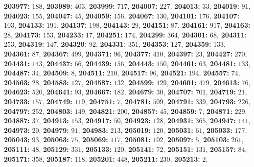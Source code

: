 \textsf{\bfseries 203977:} $188$, \textsf{\bfseries 203989:} $403$, \textsf{\bfseries 203999:} $717$, \textsf{\bfseries 204007:} $227$, \textsf{\bfseries 204013:} $33$, \textsf{\bfseries 204019:} $91$, \textsf{\bfseries 204023:} $155$, \textsf{\bfseries 204047:} $45$, \textsf{\bfseries 204059:} $156$, \textsf{\bfseries 204067:} $130$, \textsf{\bfseries 204101:} $176$, \textsf{\bfseries 204107:} $103$, \textsf{\bfseries 204133:} $191$, \textsf{\bfseries 204137:} $198$, \textsf{\bfseries 204143:} $29$, \textsf{\bfseries 204151:} $87$, \textsf{\bfseries 204161:} $917$, \textsf{\bfseries 204163:} $28$, \textsf{\bfseries 204173:} $153$, \textsf{\bfseries 204233:} $17$, \textsf{\bfseries 204251:} $174$, \textsf{\bfseries 204299:} $364$, \textsf{\bfseries 204301:} $68$, \textsf{\bfseries 204311:} $253$, \textsf{\bfseries 204319:} $147$, \textsf{\bfseries 204329:} $92$, \textsf{\bfseries 204331:} $351$, \textsf{\bfseries 204353:} $127$, \textsf{\bfseries 204359:} $133$, \textsf{\bfseries 204361:} $87$, \textsf{\bfseries 204367:} $499$, \textsf{\bfseries 204371:} $96$, \textsf{\bfseries 204377:} $410$, \textsf{\bfseries 204397:} $23$, \textsf{\bfseries 204427:} $270$, \textsf{\bfseries 204431:} $143$, \textsf{\bfseries 204437:} $66$, \textsf{\bfseries 204439:} $156$, \textsf{\bfseries 204443:} $150$, \textsf{\bfseries 204461:} $63$, \textsf{\bfseries 204481:} $133$, \textsf{\bfseries 204487:} $34$, \textsf{\bfseries 204509:} $8$, \textsf{\bfseries 204511:} $210$, \textsf{\bfseries 204517:} $96$, \textsf{\bfseries 204521:} $194$, \textsf{\bfseries 204557:} $74$, \textsf{\bfseries 204563:} $28$, \textsf{\bfseries 204583:} $127$, \textsf{\bfseries 204587:} $132$, \textsf{\bfseries 204599:} $429$, \textsf{\bfseries 204601:} $479$, \textsf{\bfseries 204613:} $76$, \textsf{\bfseries 204623:} $520$, \textsf{\bfseries 204641:} $93$, \textsf{\bfseries 204667:} $182$, \textsf{\bfseries 204679:} $30$, \textsf{\bfseries 204707:} $701$, \textsf{\bfseries 204719:} $21$, \textsf{\bfseries 204733:} $157$, \textsf{\bfseries 204749:} $119$, \textsf{\bfseries 204751:} $7$, \textsf{\bfseries 204781:} $509$, \textsf{\bfseries 204791:} $339$, \textsf{\bfseries 204793:} $226$, \textsf{\bfseries 204797:} $252$, \textsf{\bfseries 204803:} $149$, \textsf{\bfseries 204821:} $200$, \textsf{\bfseries 204857:} $45$, \textsf{\bfseries 204859:} $7$, \textsf{\bfseries 204871:} $229$, \textsf{\bfseries 204887:} $37$, \textsf{\bfseries 204913:} $153$, \textsf{\bfseries 204917:} $50$, \textsf{\bfseries 204923:} $128$, \textsf{\bfseries 204931:} $365$, \textsf{\bfseries 204947:} $141$, \textsf{\bfseries 204973:} $20$, \textsf{\bfseries 204979:} $91$, \textsf{\bfseries 204983:} $213$, \textsf{\bfseries 205019:} $120$, \textsf{\bfseries 205031:} $61$, \textsf{\bfseries 205033:} $177$, \textsf{\bfseries 205043:} $93$, \textsf{\bfseries 205063:} $75$, \textsf{\bfseries 205069:} $117$, \textsf{\bfseries 205081:} $102$, \textsf{\bfseries 205097:} $5$, \textsf{\bfseries 205103:} $261$, \textsf{\bfseries 205111:} $48$, \textsf{\bfseries 205129:} $331$, \textsf{\bfseries 205133:} $120$, \textsf{\bfseries 205141:} $72$, \textsf{\bfseries 205151:} $131$, \textsf{\bfseries 205157:} $84$, \textsf{\bfseries 205171:} $358$, \textsf{\bfseries 205187:} $118$, \textsf{\bfseries 205201:} $448$, \textsf{\bfseries 205211:} $230$, \textsf{\bfseries 205213:} $2$, 
